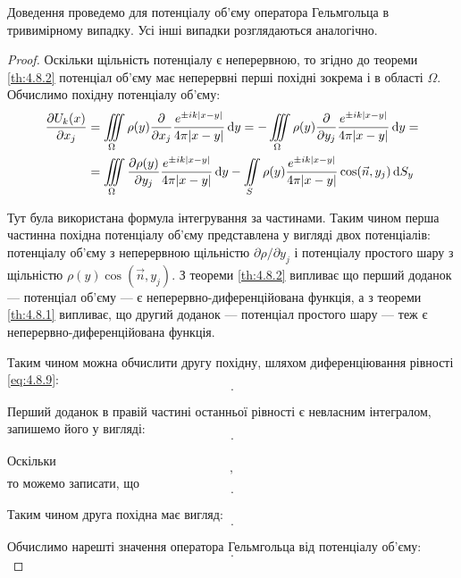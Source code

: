 Доведення проведемо для потенціалу об'єму оператора Гельмгольца в тривимірному випадку. Усі інші випадки розглядаються аналогічно.

\begin{proof}
	Оскільки щільність потенціалу є неперервною, то згідно до теореми \ref{th:4.8.2} потенціал об'єму має неперервні перші похідні зокрема і в області $\Omega$. Обчислимо похідну потенціалу об'єму:
	\begin{equation}
		\label{eq:4.8.9}
		\begin{aligned}
			\frac{\partial U_k(x)}{\partial x_j} &= \displaystyle\iiint\limits_\Omega \rho(y) \frac{\partial}{\partial x_j} \frac{e^{\pm i k |x - y|}}{4 \pi |x - y|} \mathop{}\!\mathrm{d} y = - \displaystyle\iiint\limits_\Omega \rho(y) \frac{\partial}{\partial y_j} \frac{e^{\pm i k |x - y|}}{4 \pi |x - y|} \mathop{}\!\mathrm{d} y = \\
			&= \displaystyle\iiint\limits_\Omega \frac{\partial \rho(y)}{\partial y_j} \frac{e^{\pm i k |x - y|}}{4 \pi |x - y|} \mathop{}\!\mathrm{d} y - \displaystyle\iint\limits_S \rho(y) \frac{e^{\pm i k |x - y|}}{4 \pi |x - y|} \cos(\vec n, y_j) \mathop{}\!\mathrm{d} S_y
		\end{aligned}
	\end{equation}

	Тут була використана формула інтегрування за частинами. Таким чином перша частинна похідна потенціалу об'єму представлена у вигляді двох потенціалів: потенціалу об'єму з неперервною щільністю $\partial \rho / \partial y_j$ і потенціалу простого шару з щільністю $\rho(y) \cos(\vec n, y_j)$. З теореми \ref{th:4.8.2} випливає що перший доданок --- потенціал об'єму --- є неперервно-диференційована функція, а з теореми \ref{th:4.8.1} випливає, що другий доданок --- потенціал простого шару --- теж є неперервно-диференційована функція. \medskip

	Таким чином можна обчислити другу похідну, шляхом диференціювання рівності \eqref{eq:4.8.9}:
	\begin{equation}
		.
	\end{equation}

	Перший доданок в правій частині останньої рівності є невласним інтегралом, запишемо його у вигляді:
	\begin{equation}
		.
	\end{equation} 

	Оскільки
	\begin{equation}
		,	
	\end{equation}
	то можемо записати, що  
	\begin{equation}
		.
	\end{equation}

	Таким чином друга похідна має вигляд:
	\begin{equation}
		.
	\end{equation}

	Обчислимо нарешті значення оператора Гельмгольца від потенціалу об'єму:
	\begin{equation}
		.
	\end{equation}
\end{proof}

